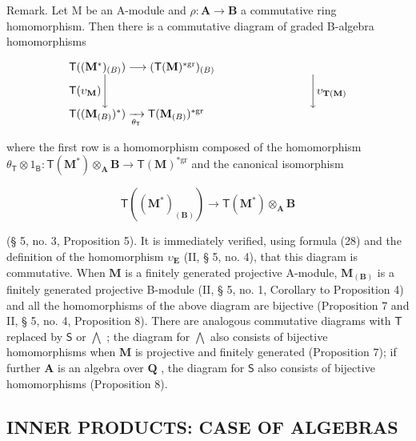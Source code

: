 Remark. Let M be an A-module and \(\rho: \mathbf{A} \to \mathbf{B}\) a commutative ring homomorphism. Then there is a commutative diagram of graded B-algebra homomorphisms

\[
\begin{array}{l} \mathsf {T} ((\mathbf {M} ^ {*}) _ {(B)}) \longrightarrow (\mathsf {T} (\mathbf {M}) ^ {* \mathrm{gr}}) _ {(B)} \\ \mathsf {T} (\upsilon_ {\mathbf {M}}) \Biggl \downarrow \qquad \qquad \qquad \qquad \qquad \qquad \qquad \qquad \qquad \Biggl \downarrow \upsilon_ {\mathbf {T} (\mathbf {M})} \\ \mathsf {T} ((\mathbf {M} _ {(B)}) ^ {*}) \xrightarrow [ \theta_ {\mathsf {T}} ]{} \mathsf {T} (\mathbf {M} _ {(B)}) ^ {* \mathrm{gr}} \end{array}
\]

where the first row is a homomorphism composed of the homomorphism \(\theta_{\mathsf{T}}\otimes 1_{\mathsf{B}}\colon \mathsf{T}(\mathbf{M}^{*})\otimes_{\mathbf{A}}\mathbf{B}\to \mathsf{T}(\mathbf{M})^{*\mathrm{gr}}\) and the canonical isomorphism

\[
\mathsf {T} ((\mathbf {M} ^ {*}) _ {(\mathbf {B})}) \rightarrow \mathsf {T} (\mathbf {M} ^ {*}) \otimes_ {\mathbf {A}} \mathbf {B}
\]

(§ 5, no. 3, Proposition 5). It is immediately verified, using formula (28) and the definition of the homomorphism \(\upsilon_{\mathbf{E}}\) (II, § 5, no. 4), that this diagram is commutative. When \(\mathbf{M}\) is a finitely generated projective A-module, \(\mathbf{M}_{(\mathbf{B})}\) is a finitely generated projective B-module (II, § 5, no. 1, Corollary to Proposition 4) and all the homomorphisms of the above diagram are bijective (Proposition 7 and II, § 5, no. 4, Proposition 8). There are analogous commutative diagrams with \(\mathsf{T}\) replaced by \(\mathsf{S}\) or \(\bigwedge\) ; the diagram for \(\bigwedge\) also consists of bijective homomorphisms when \(\mathbf{M}\) is projective and finitely generated (Proposition 7); if further \(\mathbf{A}\) is an algebra over \(\mathbf{Q}\) , the diagram for \(\mathsf{S}\) also consists of bijective homomorphisms (Proposition 8).

\subsection{INNER PRODUCTS: CASE OF ALGEBRAS}

